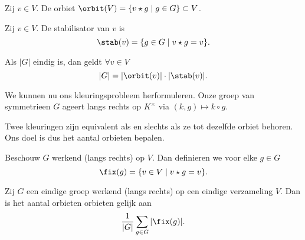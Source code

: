 \begin{definitie}
	Zij $v \in V$. De orbiet $\orbit(V) = \{v \star g \;|\; g \in G\} \subset  V$.
\end{definitie}

\begin{definitie}
	Zij $v \in V$. De stabilisator van $v$ is \[
		\stab(v)  = \{g \in G \;|\; v \star g = v\} 
	.\] 
\end{definitie}
\begin{theorem}
Als  $|G|$ eindig is, dan geldt  $\forall v \in V$ \[
	|G| = |\orbit(v)|\cdot |\stab(v)|
.\] 
\end{theorem}

We kunnen nu ons kleuringsprobleem herformuleren.
Onze groep van symmetrieen $G$ ageert langs rechts op $K^\times $ via $(k, g) \mapsto k \circ g$.

\begin{opmerking}
	Twee kleuringen zijn equivalent als en slechts als ze tot dezelfde orbiet behoren. Ons doel is dus het aantal orbieten bepalen.
\end{opmerking}

\begin{definitie}
	Beschouw $G$ werkend (langs rechts) op $V$. Dan definieren we voor elke $g \in G$  \[
		\fix(g) = \{v \in V \;|\; v \star g = v\} 
	.\] 
\end{definitie}

\begin{stelling}
	[Burnside]
	Zij $G$ een eindige groep werkend (langs rechts) op een eindige verzameling $V$. Dan is het aantal orbieten orbieten gelijk aan \[
		\frac{1}{|G|}\sum_{g \in G}|\fix(g)|
	.\] 
\end{stelling}
